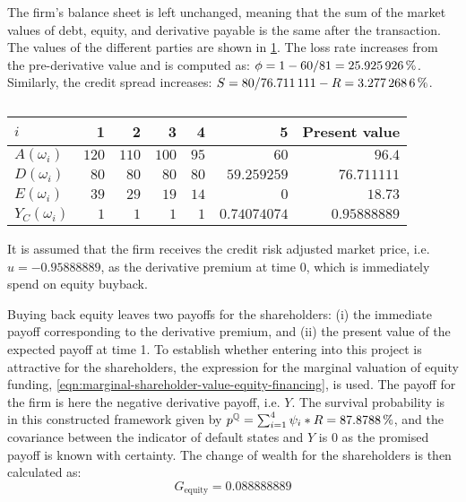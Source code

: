 \documentclass[../main.tex]{subfiles}
\begin{document}
            The firm's balance sheet is left unchanged, meaning that the sum of the market values of debt, equity, 
            and derivative payable is the same after the transaction. 
            The values of the different parties are shown in \cref{tbl:example-equity-buyback}. 
            The loss rate increases from the pre-derivative value and is computed as:
            $\phi = 1 - \num{60}/\num{81} = \pct{0.25925926}$.
            Similarly, the credit spread increases:
            $S = \num{80}/\num{76.711111} - \grossrfrate = \pct{0.032772686}$.
            \begin{table}[H]
                \centering
                \begin{tabular}{l|rrrrr||r}
                    $i$ & 1 & 2 & 3 & 4 & 5 & Present value \\
                    \hline
                    $A(\omega_{i})$ & $\num{120}$ & $\num{110}$ & $\num{100}$ & $\num{95}$ & $\num{60}$ & $\num{96.4}$ \\
                    $D(\omega_{i})$ & $\num{80}$ & $\num{80}$ & $\num{80}$ & $\num{80}$ & $\num{59.259259}$ & $\num{76.711111}$ \\
                    $E(\omega_{i})$ & $\num{39}$ & $\num{29}$ & $\num{19}$ & $\num{14}$ & $\num{0}$ & $\num{18.73}$ \\
                    $Y_C(\omega_{i})$ & $\num{1}$ & $\num{1}$ & $\num{1}$ & $\num{1}$ & $\num{0.74074074}$ & $\num{0.95888889}$ \\
                \end{tabular}
                \caption{}
                \label{tbl:example-equity-buyback}
            \end{table}

            It is assumed that the firm receives the credit risk adjusted market price,
            i.e. $u=\num{-0.95888889}$, as the derivative premium at time 0, which is immediately spend on equity buyback.

            Buying back equity leaves two payoffs for the shareholders:
            (i) the immediate payoff corresponding to the derivative premium, and
            (ii) the present value of the expected payoff at time 1.
            To establish whether entering into this project is attractive for the shareholders,
            the expression for the marginal valuation of equity funding, \cref{eqn:marginal-shareholder-value-equity-financing}, is used.
            The payoff for the firm is here the negative derivative payoff, i.e. $Y$.
            The survival probability is in this constructed framework given by $p^{\rnmeasure} = \sum_{i=1}^{4} \psi_{i} * \grossrfrate = \pct{0.878788}$, and the covariance between the indicator of default states and $Y$ is 0 as the promised payoff is known with certainty.
            The change of wealth for the shareholders is then calculated as:
            \begin{equation}
                G_{\text{equity}} = \num{0.088888889}
            \end{equation}
            
\end{document}
